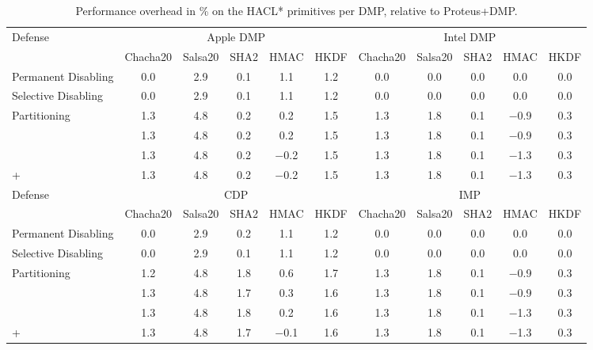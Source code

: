 \begin{table}[t]
  \centering
  \caption{Performance overhead in \% on the HACL* primitives per DMP, relative to Proteus+DMP.}
  \label{tab:hacl-results}
  \begin{tabular}{l c c c c c c c c c c}\toprule
    \multirow{2}{*}{Defense} & \multicolumn{5}{c}{Apple DMP} & \multicolumn{5}{c}{Intel DMP} \\
  \cmidrule(lr){2-6}\cmidrule(lr){7-11}
     & Chacha20 & Salsa20 & SHA2 & HMAC & HKDF & Chacha20 & Salsa20 & SHA2 & HMAC & HKDF \\ \midrule
    Permanent Disabling & \num{+0.0} & \num{+2.9} & \num{+0.1} & \num{+1.1} & \num{+1.2} & \num{+0.0} & \num{+0.0} & \num{+0.0} & \num{+0.0} & \num{+0.0} \\
    Selective Disabling & \num{+0.0} & \num{+2.9} & \num{+0.1} & \num{+1.1} & \num{+1.2} & \num{+0.0} & \num{+0.0} & \num{+0.0} & \num{+0.0} & \num{+0.0} \\
    Partitioning & \num{+1.3} & \num{+4.8} & \num{+0.2} & \num{+0.2} & \num{+1.5} & \num{+1.3} & \num{+1.8} & \num{+0.1} & \num{-0.9} & \num{+0.3} \\
    \secdmp{} & \num{+1.3} & \num{+4.8} & \num{+0.2} & \num{+0.2} & \num{+1.5} & \num{+1.3} & \num{+1.8} & \num{+0.1} & \num{-0.9} & \num{+0.3} \\
    \prospect{} & \num{+1.3} & \num{+4.8} & \num{+0.2} & \num{-0.2} & \num{+1.5} & \num{+1.3} & \num{+1.8} & \num{+0.1} & \num{-1.3} & \num{+0.3} \\
    \prospect{}+\secdmp{} & \num{+1.3} & \num{+4.8} & \num{+0.2} & \num{-0.2} & \num{+1.5} & \num{+1.3} & \num{+1.8} & \num{+0.1} & \num{-1.3} & \num{+0.3} \\
    \midrule
    \multirow{2}{*}{Defense} & \multicolumn{5}{c}{CDP} & \multicolumn{5}{c}{IMP} \\
  \cmidrule(lr){2-6}\cmidrule(lr){7-11}
     & Chacha20 & Salsa20 & SHA2 & HMAC & HKDF & Chacha20 & Salsa20 & SHA2 & HMAC & HKDF \\ \midrule
    Permanent Disabling & \num{+0.0} & \num{+2.9} & \num{+0.2} & \num{+1.1} & \num{+1.2} & \num{+0.0} & \num{+0.0} & \num{+0.0} & \num{+0.0} & \num{+0.0} \\
    Selective Disabling & \num{+0.0} & \num{+2.9} & \num{+0.1} & \num{+1.1} & \num{+1.2} & \num{+0.0} & \num{+0.0} & \num{+0.0} & \num{+0.0} & \num{+0.0} \\
    Partitioning & \num{+1.2} & \num{+4.8} & \num{+1.8} & \num{+0.6} & \num{+1.7} & \num{+1.3} & \num{+1.8} & \num{+0.1} & \num{-0.9} & \num{+0.3} \\
    \secdmp{} & \num{+1.3} & \num{+4.8} & \num{+1.7} & \num{+0.3} & \num{+1.6} & \num{+1.3} & \num{+1.8} & \num{+0.1} & \num{-0.9} & \num{+0.3} \\
    \prospect{} & \num{+1.3} & \num{+4.8} & \num{+1.8} & \num{+0.2} & \num{+1.6} & \num{+1.3} & \num{+1.8} & \num{+0.1} & \num{-1.3} & \num{+0.3} \\
    \prospect{}+\secdmp{} & \num{+1.3} & \num{+4.8} & \num{+1.7} & \num{-0.1} & \num{+1.6} & \num{+1.3} & \num{+1.8} & \num{+0.1} & \num{-1.3} & \num{+0.3} \\
    \bottomrule
  \end{tabular}
\end{table}
